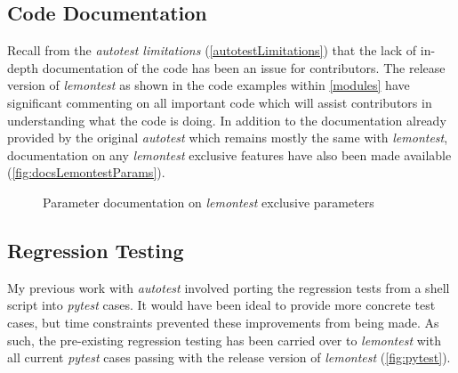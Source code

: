 \documentclass[hidelinks]{report}
\begin{document}
\subsection{Code Documentation}
Recall from the \textit{autotest limitations} (\autoref{autotestLimitations}) that the lack of in-depth documentation of the code has been an issue for contributors. The release version of \textit{lemontest} as shown in the code examples within \autoref{modules} have significant commenting on all important code which will assist contributors in understanding what the code is doing. In addition to the documentation already provided by the original \textit{autotest} which remains mostly the same with \textit{lemontest}, documentation on any \textit{lemontest} exclusive features have also been made available (\autoref{fig:docsLemontestParams}).
\begin{figure}[h]
	\centering
	\caption{Parameter documentation on \textit{lemontest} exclusive parameters}
	\label{fig:docsLemontestParams}
\end{figure}

\subsection{Regression Testing}
My previous work with \textit{autotest} involved porting the regression tests from a shell script into \textit{pytest} cases. It would have been ideal to provide more concrete test cases, but time constraints prevented these improvements from being made. As such, the pre-existing regression testing has been carried over to \textit{lemontest} with all current \textit{pytest} cases passing with the release version of \textit{lemontest} (\autoref{fig:pytest}).
\end{document}

